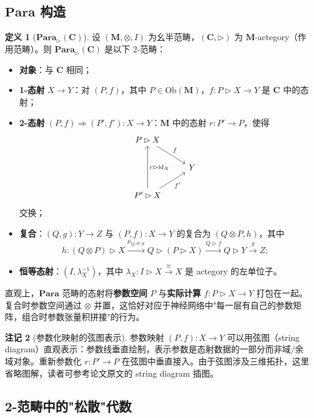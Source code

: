 \documentclass[12pt,a4paper]{ctexart}
\theoremstyle{definition}
\newtheorem{definition}{定义}[section]
\newtheorem{remark}[definition]{注记}
\newcommand{\cat}[1]{\mathbf{#1}}
\newcommand{\Para}{\cat{Para}}
\newcommand{\id}{\mathrm{id}}
\newcommand{\ob}[1]{\mathrm{Ob}(#1)}
\begin{document}
\subsection{$\Para$ 构造}

\begin{definition}[$\Para_\rhd(\cat C)$]\label{def:para}
设 $(\cat M,\otimes,I)$ 为幺半范畴，$(\cat C,\rhd)$ 为 $\cat M$-actegory（作用范畴）。则 $\Para_\rhd(\cat C)$ 是以下 2-范畴：
\begin{itemize}[nosep]
    \item \textbf{对象}：与 $\cat C$ 相同；
    \item \textbf{1-态射} $X\to Y$：对 $(P,f)$，其中 $P\in\ob{\cat M}$，$f:P\rhd X\to Y$ 是 $\cat C$ 中的态射；
    \item \textbf{2-态射} $(P,f)\Rightarrow(P',f'):X\to Y$：$\cat M$ 中的态射 $r:P'\to P$，使得
    \[
    \begin{tikzcd}
    P\rhd X \arrow[rd,"f"] & \\
    & Y \\
    P'\rhd X \arrow[ru,"f'"'] \arrow[uu,"r\rhd\id_X"']
    \end{tikzcd}
    \]
    交换；
    \item \textbf{复合}：$(Q,g):Y\to Z$ 与 $(P,f):X\to Y$ 的复合为 $(Q\otimes P, h)$，其中
    \[h:(Q\otimes P)\rhd X\xrightarrow{\mu_{Q,P,X}} Q\rhd(P\rhd X)\xrightarrow{Q\rhd f} Q\rhd Y\xrightarrow{g} Z;\]
    \item \textbf{恒等态射}：$(I,\lambda_X^{-1})$，其中 $\lambda_X:I\rhd X\xrightarrow{\cong}X$ 是 actegory 的左单位子。
\end{itemize}
\end{definition}

直观上，$\Para$ 范畴的态射将\textbf{参数空间} $P$ 与\textbf{实际计算} $f:P\rhd X\to Y$ 打包在一起。复合时参数空间通过 $\otimes$ 并置，这恰好对应于神经网络中"每一层有自己的参数矩阵，组合时参数张量积拼接"的行为。

\begin{remark}[参数化映射的弦图表示]
参数映射 $(P,f):X\to Y$ 可以用弦图（string diagram）直观表示：参数线垂直绘制，表示参数是态射数据的一部分而非域/余域对象。重新参数化 $r:P'\to P$ 在弦图中垂直接入。由于弦图涉及三维拓扑，这里省略图解，读者可参考论文原文的 string diagram 插图。
\end{remark}

\subsection{2-范畴中的"松散"代数}
\end{document}
